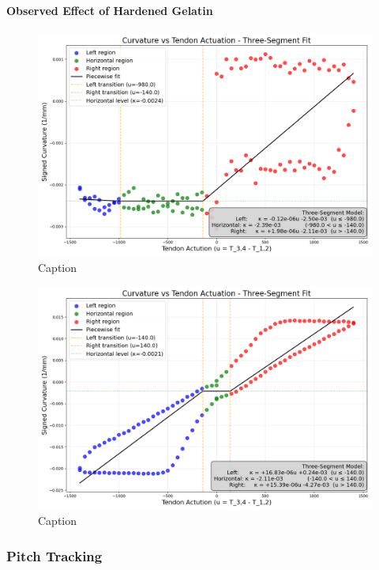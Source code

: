 \paragraph*{Observed Effect of Hardened Gelatin}
\begin{figure} [H]
    \centering
    \includegraphics[width=0.9\linewidth]{images/ribbonadapter/ribbonfit_2025-06-27_17-45-46.png}
    \caption{Caption}
    \label{fig:enter-label}
\end{figure}

\begin{figure} [H]
    \centering
    \includegraphics[width=0.9\linewidth]{images/ribbonadapter/ribbonfit_2025-06-30_15-59-06.png}
    \caption{Caption}
    \label{fig:enter-label}
\end{figure}



\subsubsection{Pitch Tracking}

